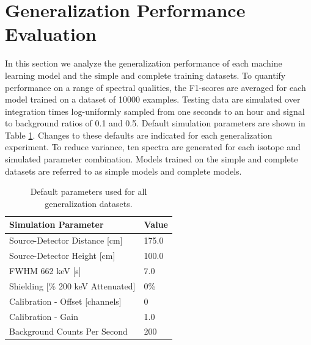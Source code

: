 \section{Generalization Performance Evaluation}

In this section we analyze the generalization performance of each machine learning model and the simple and complete training datasets. To quantify performance on a range of spectral qualities, the F1-scores are averaged for each model trained on a dataset of 10000 examples. Testing data are simulated over integration times log-uniformly sampled from one seconds to an hour and signal to background ratios of 0.1 and 0.5. Default simulation parameters are shown in Table \ref{table:default_sim_params}. Changes to these defaults are indicated for each generalization experiment. To reduce variance, ten spectra are generated for each isotope and simulated parameter combination. Models trained on the simple and complete datasets are referred to as simple models and complete models.

\begin{table}[H]
\centering
\caption{Default parameters used for all generalization datasets.}
\label{table:default_sim_params}
\begin{tabular}{ll}
\hline
\textbf{Simulation Parameter} &  \textbf{Value} \\ \hline
Source-Detector Distance [cm] & 175.0\\ 
Source-Detector Height [cm] & 100.0\\ 
FWHM 662 keV [s] & 7.0\\ 
Shielding [\% 200 keV Attenuated] & 0\% \\ 
Calibration - Offset [channels] & 0 \\ 
Calibration - Gain & 1.0 \\ 
Background Counts Per Second & 200 \\ \hline 
\end{tabular}
\end{table}



